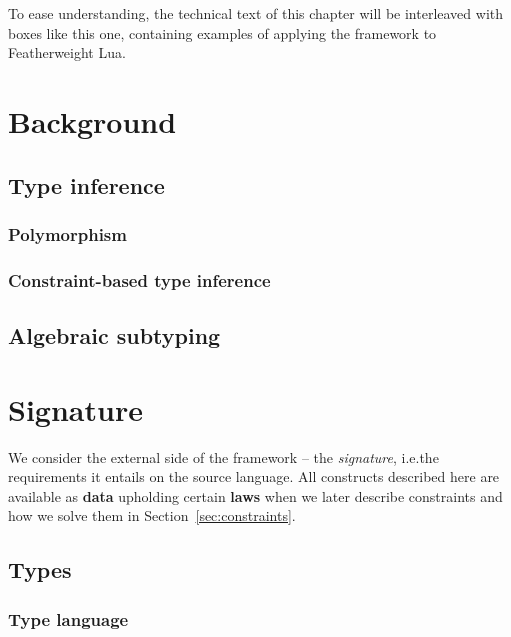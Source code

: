 \begin{tcolorbox}[colback=blue!10!white,colframe=blue!60!black]
To ease understanding, the technical text of this chapter will be interleaved with boxes like this one, containing examples of applying the framework to Featherweight Lua.
\end{tcolorbox}

\section{Background}
\label{sec:background}

\subsection{Type inference}

\subsubsection{Polymorphism}

\subsubsection{Constraint-based type inference}

\subsection{Algebraic subtyping}

\section{Signature}
\label{sec:signature}

We consider the external side of the framework -- the \emph{signature}, i.e.\@ the requirements it entails on the source language. All constructs described here are available as \textbf{data} upholding certain \textbf{laws} when we later describe constraints and how we solve them in Section~\ref{sec:constraints}.

\subsection{Types}
\label{subsec:types}

\subsubsection{Type language}

